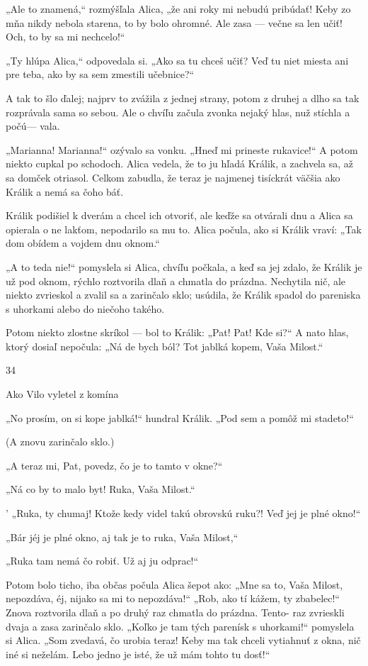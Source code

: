 \documentclass[12pt]{article}
\begin{document}
\begin{Parallel}[p]{}{}
{{„Ale to znamená,“ rozmýšľala Alica, „že ani roky mi
nebudú pribúdať! Keby zo mňa nikdy nebola starena, to by
bolo ohromné. Ale zasa — večne sa len učiť! Och, to by
sa mi nechcelo!“

„Ty hlúpa Alica,“ odpovedala si. „Ako sa tu chceš učiť?
Veď tu niet miesta ani pre teba, ako by sa sem zmestili
učebnice?“

A tak to šlo ďalej; najprv to zvážila z jednej strany,
potom z druhej a dlho sa tak rozprávala sama so sebou. Ale
o chvíľu začula zvonka nejaký hlas, nuž stíchla a počú—
vala.

„Marianna! Marianna!“ ozývalo sa vonku. „Hneď mi
prineste rukavice!“ A potom niekto cupkal po schodoch.
Alica vedela, že to ju hľadá Králik, a zachvela sa, až sa
domček otriasol. Celkom zabudla, že teraz je najmenej
tisíckrát väčšia ako Králik a nemá sa čoho báť.

Králik podišiel k dverám a chcel ich otvoriť, ale keďže sa
otvárali dnu a Alica sa opierala o ne lakťom, nepodarilo sa
mu to. Alica počula, ako si Králik vraví: „Tak dom obídem
a vojdem dnu oknom.“

„A to teda nie!“ pomyslela si Alica, chvíľu počkala,
a keď sa jej zdalo, že Králik je už pod oknom, rýchlo
roztvorila dlaň a chmatla do prázdna. Nechytila nič, ale
niekto zvrieskol a zvalil sa a zarinčalo sklo; usúdila, že
Králik spadol do pareniska s uhorkami alebo do niečoho
takého.

Potom niekto zlostne skríkol — bol to Králik: „Pat! Pat!
Kde si?“ A nato hlas, ktorý dosiaľ nepočula: „Ná de bych
ból? Tot jablká kopem, Vaša Milost.“

34

Ako Vilo vyletel z komína

„No prosím, on si kope jablká!“ hundral Králik. „Pod
sem a pomôž mi stadeto!“

(A znovu zarinčalo sklo.)

„A teraz mi, Pat, povedz, čo je to tamto v okne?“

„Ná co by to malo byt! Ruka, Vaša Milost.“

' „Ruka, ty chumaj! Ktože kedy videl takú obrovskú
ruku?! Veď jej je plné okno!“

„Bár jéj je plné okno, aj tak je to ruka, Vaša Milost,“

„Ruka tam nemá čo robiť. Už aj ju odprac!“

Potom bolo ticho, iba občas počula Alica šepot ako:
„Mne sa to, Vaša Milost, nepozdáva, éj, nijako sa mi to
nepozdáva!“ „Rob, ako tí kážem, ty zbabelec!“ Znova
roztvorila dlaň a po druhý raz chmatla do prázdna. Tento-
raz zvrieskli dvaja a zasa zarinčalo sklo. „Koľko je tam tých
parenísk s uhorkami!“ pomyslela si Alica. „Som zvedavá,
čo urobia teraz! Keby ma tak chceli vytiahnuť z okna, nič
iné si neželám. Lebo jedno je isté, že už mám tohto tu
dosť!“

}}
\end{Parallel}
\end{document}
